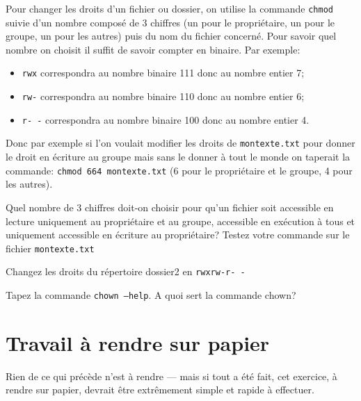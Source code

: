 \documentclass[12pt]{article}
\begin{document}
	Pour changer les droits d'un fichier ou dossier, on utilise la commande \texttt{chmod} suivie d'un nombre composé de 3 chiffres (un pour le propriétaire, un pour le groupe, un pour les autres) puis du nom du fichier concerné. Pour savoir quel nombre on choisit il suffit de savoir compter en binaire. Par exemple:
	\begin{itemize}
		\item \texttt{rwx} correspondra au nombre binaire 111 donc au nombre entier 7;
		\item \texttt{rw-} correspondra au nombre binaire 110 donc au nombre entier 6;
		\item \texttt{r-\,-} correspondra au nombre binaire 100 donc au nombre entier 4.
	\end{itemize}
	
	Donc par exemple si l'on voulait modifier les droits de \texttt{montexte.txt} pour donner le droit en écriture au groupe mais sans le donner à tout le monde on taperait la commande: \texttt{chmod 664 montexte.txt} (6 pour le propriétaire et le groupe, 4 pour les autres).
	
	\begin{MonExo}
		\begin{alphenum}
			\item Quel nombre de 3 chiffres doit-on choisir pour qu'un fichier soit accessible en lecture uniquement au propriétaire et au groupe, accessible en exécution à tous et uniquement accessible en écriture au propriétaire? Testez votre commande sur le fichier \texttt{montexte.txt}
			\item Changez les droits du répertoire dossier2 en \texttt{rwxrw-r-\,-}
			\item Tapez la commande \texttt{chown --help}. A quoi sert la commande chown?
		\end{alphenum}
	\end{MonExo}
	
	\pagebreak
	\section{Travail à rendre sur papier}
	
	Rien de ce qui précède n'est à rendre --- mais si tout a été fait, cet exercice, à rendre sur papier, devrait être extrêmement simple et rapide à effectuer.
	
\end{document}
